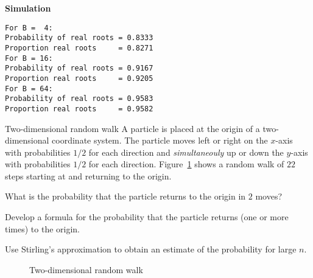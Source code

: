 \textbf{Simulation}
\begin{verbatim}
For B =  4:
Probability of real roots = 0.8333
Proportion real roots     = 0.8271
For B = 16:
Probability of real roots = 0.9167
Proportion real roots     = 0.9205
For B = 64:
Probability of real roots = 0.9583
Proportion real roots     = 0.9582
\end{verbatim}


\begin{prob}{Two-dimensional random walk}
A particle is placed at the origin of a two-dimensional coordinate system. The particle moves left or right on the $x$-axis with probabilities $1/2$ for each direction and \emph{simultaneouly} up or down the $y$-axis with probabilities $1/2$ for each direction. Figure~\ref{f.2d-random-walk} shows a random walk of $22$ steps starting at and returning to the origin.

 What is the probability that the particle returns to the origin in $2$ moves?

 Develop a formula for the probability that the particle returns (one or more times) to the origin.

 Use Stirling's approximation to obtain an estimate of the probability for large $n$.

\begin{figure}[t]
\begin{center}
\end{center}
\caption{Two-dimensional random walk}\label{f.2d-random-walk}
\end{figure}
\end{prob}
\solution{}

